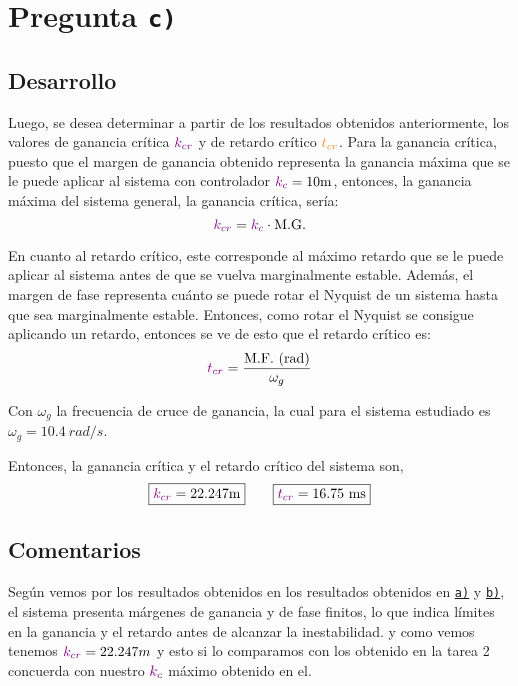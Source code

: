 \section{Pregunta \texttt{c)}}\label{pregunta-c}

\subsection{Desarrollo}

Luego, se desea determinar a partir de los resultados obtenidos anteriormente,
los valores de ganancia crítica $\mathbin{\color{violet}k_{cr}}$ y de retardo crítico $\nara{t_{cr}}$.
Para la ganancia crítica, puesto que el margen de ganancia obtenido representa
la ganancia máxima que se le puede aplicar al sistema con controlador $\mora{k_{c}} = 10\unit{m}$,
entonces, la ganancia máxima del sistema general, la ganancia crítica, sería:
\begin{equation}
  \mathbin{\color{violet}k_{cr}} = \mathbin{\color{violet}k_{c}} \cdot \text{M.G.}
\end{equation}

En cuanto al retardo crítico, este corresponde al máximo retardo que se le
puede aplicar al sistema antes de que se vuelva marginalmente estable. Además,
el margen de fase representa cuánto se puede rotar el Nyquist de un sistema
hasta que sea marginalmente estable. Entonces, como rotar el Nyquist se consigue
aplicando un retardo, entonces se ve de esto que el retardo crítico es:
\begin{equation}
  \mora{t_{cr}} = \frac{\te{M.F.}\ \te{(rad)}}{\omega_{g}}
\end{equation}

Con $\omega_{g}$ la frecuencia de cruce de ganancia, la cual para el sistema
estudiado es $\omega_{g} = 10.4\ \unit{rad/s}$.

Entonces, la ganancia crítica y el retardo crítico del sistema son,
\begin{equation}
  \boxed{\mora{k_{cr}} = 22.247\unit{m}} \qquad \boxed{\mora{t_{cr}} = 16.75\ \unit{ms}}
\end{equation}


\FloatBarrier
\subsection{Comentarios}


Según vemos por los resultados obtenidos en los resultados obtenidos en \hyperref[pregunta-c]{\texttt{a)}} y \hyperref[pregunta-c]{\texttt{b)}}, el sistema presenta márgenes de ganancia y de fase finitos, lo que indica límites en la ganancia y el retardo antes de alcanzar la inestabilidad.
y como vemos tenemos \(\mathbin{\color{violet}k_{cr}} = 22.247 m\) y esto si lo comparamos con los obtenido en la tarea 2 \cite{tarea-2-sdc} concuerda con nuestro \(\mathbin{\color{violet}k_c}\) máximo obtenido en el. 

